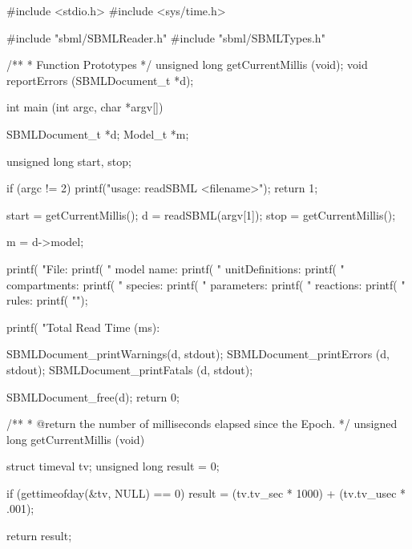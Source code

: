 \documentclass{sbmlmanual}
\begin{document}
\begin{codeVerbatim}[C,flexiblecolumns=false]
#include <stdio.h>
#include <sys/time.h>

#include "sbml/SBMLReader.h"
#include "sbml/SBMLTypes.h"

/**
 * Function Prototypes
 */
unsigned long getCurrentMillis (void);
void          reportErrors     (SBMLDocument_t *d);


int
main (int argc, char *argv[])
{
  SBMLDocument_t *d;
  Model_t *m;

  unsigned long start, stop;


  if (argc != 2)
  {
    printf("usage: readSBML <filename>\n");
    return 1;
  }

  start = getCurrentMillis();
  d     = readSBML(argv[1]);
  stop  = getCurrentMillis();

  m = d->model;

  printf( "File: %
  printf( "       model name: %
  printf( "  unitDefinitions: %
  printf( "     compartments: %
  printf( "          species: %
  printf( "       parameters: %
  printf( "        reactions: %
  printf( "            rules: %
  printf( "\n");

  printf( "Total Read Time (ms): %

  SBMLDocument_printWarnings(d, stdout);
  SBMLDocument_printErrors  (d, stdout);
  SBMLDocument_printFatals  (d, stdout);

  SBMLDocument_free(d);
  return 0;
}


/**
 * @return the number of milliseconds elapsed since the Epoch.
 */
unsigned long
getCurrentMillis (void)
{
  struct timeval tv;
  unsigned long  result = 0;


  if (gettimeofday(&tv, NULL) == 0)
  {
    result = (tv.tv_sec * 1000) + (tv.tv_usec * .001);
  }

  return result;
}
\end{codeVerbatim}

\end{document}
